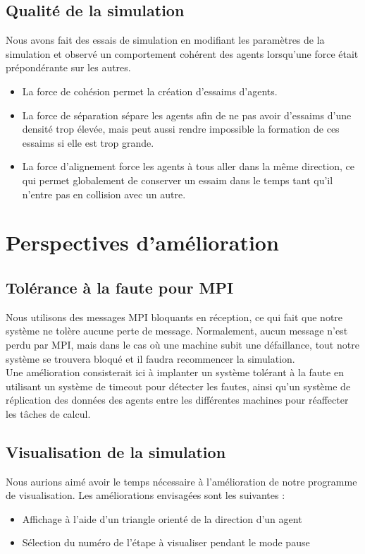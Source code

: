 \documentclass[12pt,a4paper,sans]{article}
\begin{document}
\subsection{Qualité de la simulation}
Nous avons fait des essais de simulation en modifiant les paramètres de la simulation et observé un comportement cohérent des agents lorsqu'une force était prépondérante sur les autres.
\begin{itemize}
    \item La force de cohésion permet la création d'essaims d'agents.
    \item La force de séparation sépare les agents afin de ne pas avoir d'essaims d'une densité trop élevée, mais peut aussi rendre impossible la formation de ces essaims si elle est trop grande.
    \item La force d'alignement force les agents à tous aller dans la même direction, ce qui permet globalement de conserver un essaim dans le temps tant qu'il n'entre pas en collision avec un autre.
\end{itemize}



\section{Perspectives d'amélioration}

\subsection{Tolérance à la faute pour MPI}
Nous utilisons des messages MPI bloquants en réception, ce qui fait que notre système ne tolère aucune perte de message. Normalement, aucun message n'est perdu par MPI, mais dans le cas où une machine subit une défaillance, tout notre système se trouvera bloqué et il faudra recommencer la simulation.\\
Une amélioration consisterait ici à implanter un système tolérant à la faute en utilisant un système de timeout pour détecter les fautes, ainsi qu'un système de réplication des données des agents entre les différentes machines pour réaffecter les tâches de calcul.

\subsection{Visualisation de la simulation}
Nous aurions aimé avoir le temps nécessaire à l'amélioration de notre programme de visualisation. Les améliorations envisagées sont les suivantes :
\begin{itemize}
    \item Affichage à l'aide d'un triangle orienté de la direction d'un agent
    \item Sélection du numéro de l'étape à visualiser pendant le mode pause
\end{itemize}
\end{document}

